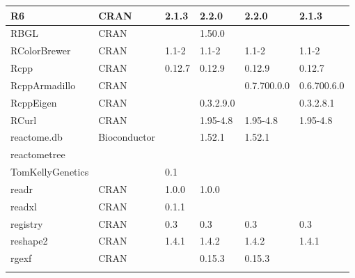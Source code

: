 \begin{longtable}{|llllll|}
R6                            & CRAN                      & 2.1.3       & 2.2.0       & 2.2.0          & 2.1.3            \\ \hline
RBGL                          & CRAN                      &             & 1.50.0      &                &                   \\ \hline \rowcolor{gray!25}
RColorBrewer                  & CRAN                      & 1.1-2       & 1.1-2       & 1.1-2          & 1.1-2            \\ \hline
Rcpp                          & CRAN                      & 0.12.7      & 0.12.9      & 0.12.9         & 0.12.7            \\ \hline \rowcolor{gray!25}
RcppArmadillo                 & CRAN                      &             &             & 0.7.700.0.0    & 0.6.700.6.0      \\ \hline
RcppEigen                     & CRAN                      &             & 0.3.2.9.0   &                & 0.3.2.8.1         \\ \hline \rowcolor{gray!25}
RCurl                         & CRAN                      &             & 1.95-4.8    & 1.95-4.8       & 1.95-4.8         \\ \hline
reactome.db                   & Bioconductor              &             & 1.52.1      & 1.52.1         &                   \\ \hline \rowcolor{gray!25}
reactometree                  & \begin{tabular}[c]{@{}l@{}}GitHub \\ TomKellyGenetics \end{tabular}  &             & 0.1         &                &                  \\ \hline
readr                         & CRAN                      & 1.0.0       & 1.0.0       &                &                   \\ \hline \rowcolor{gray!25}
readxl                        & CRAN                      & 0.1.1       &             &                &                  \\ \hline
registry                      & CRAN                      & 0.3         & 0.3         & 0.3            & 0.3               \\ \hline \rowcolor{gray!25}
reshape2                      & CRAN                      & 1.4.1       & 1.4.2       & 1.4.2          & 1.4.1            \\ \hline
rgexf                         & CRAN                      &             & 0.15.3      & 0.15.3         &                   \\ \hline \rowcolor{gray!25}

\end{longtable}
